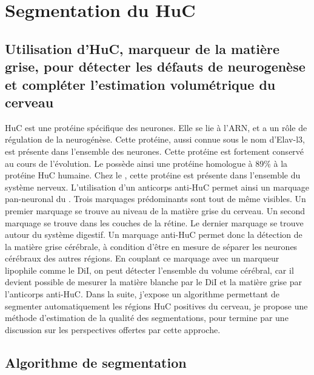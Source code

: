 \documentclass[\main/main.tex]{subfiles}
\begin{document}
                    
\section{\label{sec:HuC}Segmentation du HuC}

    \subsection{Utilisation d'HuC, marqueur de la matière grise, pour détecter les défauts de neurogenèse et compléter l'estimation volumétrique du cerveau}

%
HuC est une protéine spécifique des neurones. Elle se lie à l'ARN, et a un rôle de régulation de la neurogénèse. Cette protéine, aussi connue sous le nom d'Elav-l3, est présente dans l'ensemble des neurones. Cette protéine est fortement conservé au cours de l'évolution. Le \pz{} possède ainsi une protéine homologue à 89\% à la protéine HuC humaine.
%
Chez le \pz{}, cette protéine est présente dans l'ensemble du système nerveux.
L'utilisation d'un anticorps anti-HuC permet ainsi un marquage pan-neuronal du \pz{}. Trois marquages prédominants sont tout de même visibles. Un premier marquage se trouve au niveau de la matière grise du cerveau. Un second marquage se trouve dans les couches de la rétine. Le dernier marquage se trouve autour du système digestif.
Un marquage anti-HuC permet donc la détection de la matière grise cérébrale, à condition d'être en mesure de séparer les neurones cérébraux des autres régions. En couplant ce marquage avec un marqueur lipophile comme le DiI, on peut détecter l'ensemble du volume cérébral, car il devient possible de mesurer la matière blanche par le DiI et la matière grise par l'anticorps anti-HuC.
Dans la suite, j'expose un algorithme permettant de segmenter automatiquement les régions HuC positives du cerveau, je propose une méthode d'estimation de la qualité des segmentations, pour termine par une discussion sur les perspectives offertes par cette approche.
    
    \subsection{Algorithme de segmentation}
    
\end{document}
